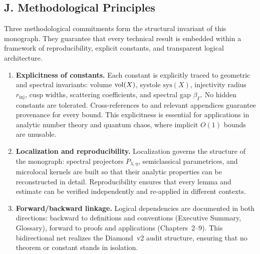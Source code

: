 
\subsection*{J. Methodological Principles}

Three methodological commitments form the structural invariant of this monograph.
They guarantee that every technical result is embedded within a framework of
reproducibility, explicit constants, and transparent logical architecture.

\begin{enumerate}[label=\arabic*.]
  \item \textbf{Explicitness of constants.}
  Each constant is explicitly traced to geometric and spectral invariants:
  volume $\operatorname{vol}(X)$, systole $\mathrm{sys}(X)$, injectivity radius $r_{\mathrm{inj}}$,
  cusp widths, scattering coefficients, and spectral gap $\beta_\Gamma$.
  No hidden constants are tolerated.
  Cross-references to  and relevant appendices
  guarantee provenance for every bound.
  This explicitness is essential for applications in analytic number theory
  and quantum chaos, where implicit $O(1)$ bounds are unusable.

  \item \textbf{Localization and reproducibility.}
  Localization governs the structure of the monograph:
  spectral projectors $P_{\lambda,\eta}$, semiclassical parametrices,
  and microlocal kernels are built so that their analytic properties
  can be reconstructed in detail.
  Reproducibility ensures that every lemma and estimate can be verified independently
  and re-applied in different contexts.

  \item \textbf{Forward/backward linkage.}
  Logical dependencies are documented in both directions:
  backward to definitions and conventions (Executive Summary, Glossary),
  forward to proofs and applications (Chapters~2–9).
  This bidirectional net realizes the Diamond~v2 audit structure,
  ensuring that no theorem or constant stands in isolation.
\end{enumerate}

